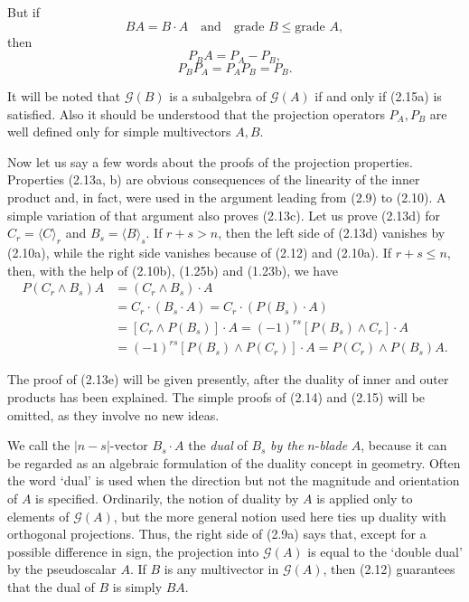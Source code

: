 \documentclass[fleqn]{scrartcl}
\numberwithin{equation}{section}
\begin{document}
\noindent But if
\begin{equation}
BA = B \cdot A \quad \text{and} \quad \text{grade } B \leq \text{grade } A, \tag{2.15a}
\end{equation}
then
\begin{equation}
P_B A = P_A - P_B, \tag{2.15b}
\end{equation}
\begin{equation}
P_B P_A = P_A P_B = P_B. \tag{2.15c}
\end{equation}

\vspace{1em}
\noindent It will be noted that \(\mathscr{G}(B)\) is a subalgebra of \(\mathscr{G}(A)\) if and only if (2.15a) is satisfied. Also it should be understood that the projection operators \(P_A, P_B\) are well defined only for simple multivectors \(A, B\).

\vspace{1em}
\noindent Now let us say a few words about the proofs of the projection properties. Properties (2.13a, b) are obvious consequences of the linearity of the inner product and, in fact, were used in the argument leading from (2.9) to (2.10). A simple variation of that argument also proves (2.13c). Let us prove (2.13d) for \(C_r = \langle C \rangle_r\) and \(B_s = \langle B \rangle_s\). If \(r+s > n\), then the left side of (2.13d) vanishes by (2.10a), while the right side vanishes because of (2.12) and (2.10a). If \(r+s \leq n\), then, with the help of (2.10b), (1.25b) and (1.23b), we have
\begin{align*}
P(C_r \wedge B_s)A &= (C_r \wedge B_s) \cdot A \\
&= C_r \cdot (B_s \cdot A) = C_r \cdot (P(B_s) \cdot A) \\
&= [C_r \wedge P(B_s)] \cdot A = (-1)^{rs} [P(B_s) \wedge C_r] \cdot A \\
&= (-1)^{rs} [P(B_s) \wedge P(C_r)] \cdot A = P(C_r) \wedge P(B_s)A.
\end{align*}

\vspace{1em}
\noindent The proof of (2.13e) will be given presently, after the duality of inner and outer products has been explained. The simple proofs of (2.14) and (2.15) will be omitted, as they involve no new ideas.

\vspace{1em}
\noindent We call the \(|n-s|\)-vector \(B_s \cdot A\) the \textit{dual} of \(B_s\) \textit{by the} \(n\)-\textit{blade} \(A\), because it can be regarded as an algebraic formulation of the duality concept in geometry. Often the word `dual' is used when the direction but not the magnitude and orientation of \(A\) is specified. Ordinarily, the notion of duality by \(A\) is applied only to elements of \(\mathscr{G}(A)\), but the more general notion used here ties up duality with orthogonal projections. Thus, the right side of (2.9a) says that, except for a possible difference in sign, the projection into \(\mathscr{G}(A)\) is equal to the `double dual' by the pseudoscalar \(A\). If \(B\) is any multivector in \(\mathscr{G}(A)\), then (2.12) guarantees that the dual of \(B\) is simply \(BA\).
\end{document}

